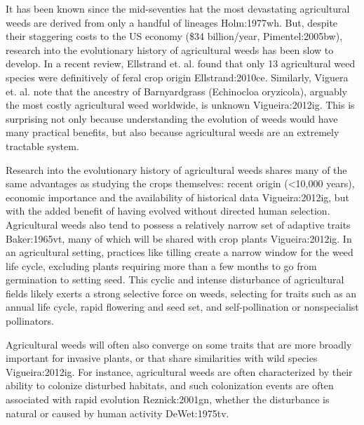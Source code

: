 \documentclass[twocolumn]{bmcart}%
\begin{document}
It has been known since the mid-seventies hat the most devastating agricultural weeds are derived from only a handful of lineages  {Holm:1977wh}. But, despite their staggering costs to the US economy (\$34 billion/year, {Pimentel:2005bw}), research into the evolutionary history of agricultural weeds has been slow to develop. In a recent review, Ellstrand et. al. found that only 13 agricultural weed species were definitively of feral crop origin {Ellstrand:2010ce}. Similarly, Viguera et. al. note that the ancestry of Barnyardgrass (Echinocloa oryzicola), arguably the most costly agricultural weed worldwide, is unknown {Vigueira:2012ig}. This is surprising not only because understanding the evolution of weeds would have many practical benefits, but also because agricultural weeds are an extremely tractable system. 

Research into the evolutionary history of agricultural weeds shares many of the same advantages as studying the crops themselves: recent origin (<10,000 years), economic importance and the availability of historical data {Vigueira:2012ig}, but with the added benefit of having evolved without directed human selection. Agricultural weeds also tend to possess a relatively narrow set of adaptive traits {Baker:1965vt}, many of which will be shared with crop plants {Vigueira:2012ig}. In an agricultural setting, practices like tilling create a narrow window for the weed life cycle, excluding plants requiring more than a few months to go from germination to setting seed. This cyclic and intense disturbance of agricultural fields likely exerts a strong selective force on weeds, selecting for traits such as an annual life cycle, rapid flowering and seed set, and self-pollination or nonspecialist pollinators.
%
%
%
%
%
%

Agricultural weeds will often also converge on some traits that are more broadly important for invasive plants, or that share similarities with wild species {Vigueira:2012ig}. For instance, agricultural weeds are often characterized by their ability to colonize disturbed habitats, and such colonization events are often associated with rapid evolution {Reznick:2001gn}, whether the disturbance is natural or caused by human activity {DeWet:1975tv}. 
\end{document}
